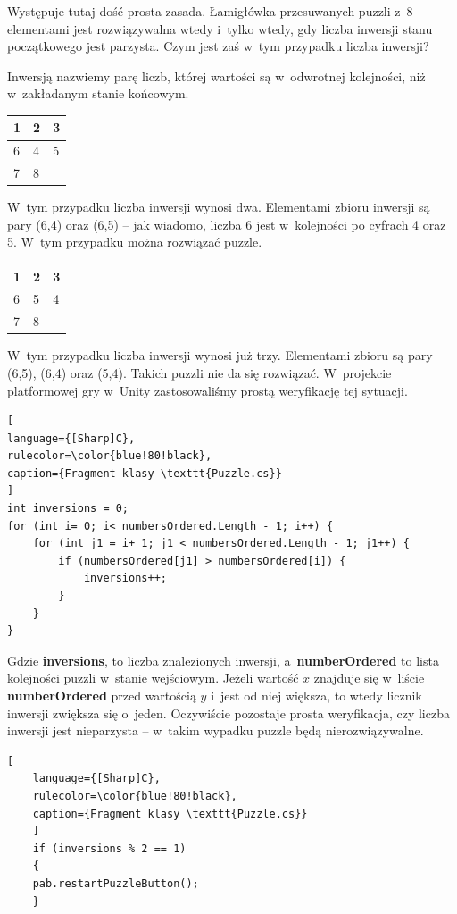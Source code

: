 \documentclass[oneside,polski,logo]{amuthesis}
\begin{document}
Występuje tutaj dość prosta zasada. Łamigłówka przesuwanych puzzli z~8 elementami jest rozwiązywalna wtedy i~tylko wtedy, gdy liczba inwersji stanu początkowego jest parzysta. Czym jest zaś w~tym przypadku liczba inwersji?

Inwersją nazwiemy parę liczb, której wartości są w~odwrotnej kolejności, niż w~zakładanym stanie końcowym. \cite{solvablePuzzle}

\begin{center}
\begin{tabular}{ | m{5em} | m{1cm}| m{1cm} | } 
\hline
 1 & 2 & 3 \\ 
\hline
 6 & 4 & 5 \\
\hline  
 7 & 8 &     \\
\hline
\end{tabular}
\end{center}

W~tym przypadku liczba inwersji wynosi dwa. Elementami zbioru inwersji są pary (6,4) oraz (6,5) – jak wiadomo, liczba 6 jest w~kolejności po cyfrach 4 oraz 5. W~tym przypadku można rozwiązać puzzle.

\begin{center}
\begin{tabular}{ | m{5em} | m{1cm}| m{1cm} | } 
\hline
 1 & 2 & 3 \\ 
\hline
 6 & 5 & 4 \\  
\hline
 7 & 8 &     \\
\hline
\end{tabular}
\end{center}

W~tym przypadku liczba inwersji wynosi już trzy. Elementami zbioru są pary (6,5), (6,4) oraz (5,4). Takich puzzli nie da się rozwiązać. 
W~projekcie platformowej gry w~Unity zastosowaliśmy prostą weryfikację tej sytuacji. 
\\
\begin{lstlisting}[
language={[Sharp]C},
rulecolor=\color{blue!80!black},
caption={Fragment klasy \texttt{Puzzle.cs}}
]
int inversions = 0;
for (int i= 0; i< numbersOrdered.Length - 1; i++) {
    for (int j1 = i+ 1; j1 < numbersOrdered.Length - 1; j1++) {
        if (numbersOrdered[j1] > numbersOrdered[i]) {
            inversions++;
        }
    }
}

\end{lstlisting}
\par Gdzie \textbf{inversions}, to liczba znalezionych inwersji, a~\textbf{numberOrdered} to lista kolejności puzzli w~stanie wejściowym. Jeżeli wartość \(x\) znajduje się w~liście \textbf{numberOrdered} przed wartością \(y\) i~jest od niej większa, to wtedy licznik inwersji zwiększa się o~jeden.
Oczywiście pozostaje prosta weryfikacja, czy liczba inwersji jest nieparzysta – w~takim wypadku puzzle będą nierozwiązywalne.
\begin{lstlisting}[
	language={[Sharp]C},
	rulecolor=\color{blue!80!black},
	caption={Fragment klasy \texttt{Puzzle.cs}}
	]
	if (inversions % 2 == 1)
	{
	pab.restartPuzzleButton();
	}
\end{lstlisting}
\end{document}
